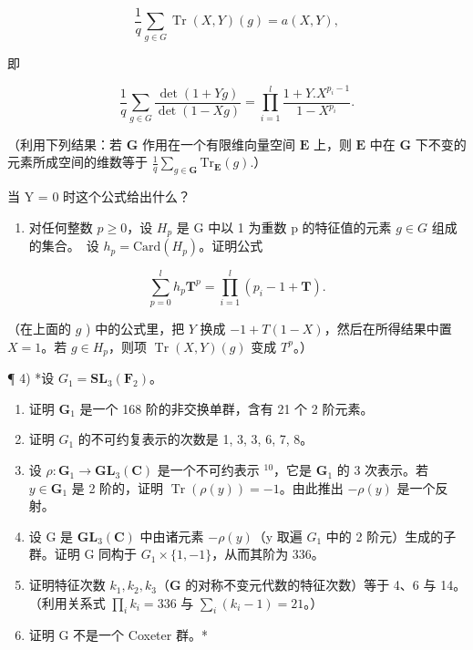\[
\frac {1}{q} \sum_ {g \in G} \operatorname{Tr} (X, Y) (g) = a (X, Y),
\]

即

\[
\frac {1}{q} \sum_ {g \in G} \frac {\det (1 + Y g)}{\det (1 - X g)} = \prod_ {i = 1} ^ {l} \frac {1 + Y . X ^ {p _ {i} - 1}}{1 - X ^ {p _ {i}}}.
\]

（利用下列结果：若 \(\mathbf{G}\) 作用在一个有限维向量空间 \(\mathbf{E}\) 上，则 \(\mathbf{E}\) 中在 \(\mathbf{G}\) 下不变的元素所成空间的维数等于 \(\frac{1}{q}\sum_{g\in \mathbf{G}}\mathrm{Tr}_{\mathbf{E}}(g).\)）

当 Y = 0 时这个公式给出什么？

\begin{enumerate}
\def\labelenumi{\alph{enumi})}
\setcounter{enumi}{7}
\tightlist
\item
  对任何整数 \(p \geqslant 0\)，设 \(H_{p}\) 是 G 中以 1 为重数 p 的特征值的元素 \(g \in G\) 组成的集合。~设 \(h_{p} = \text{Card}(H_{p})\)。证明公式
\end{enumerate}

\[
\sum_ {p = 0} ^ {l} h _ {p} \mathbf {T} ^ {p} = \prod_ {i = 1} ^ {l} (p _ {i} - 1 + \mathbf {T}).
\]

（在上面的 \(g\) ) 中的公式里，把 \(Y\) 换成 \(-1 + T(1 - X)\)，然后在所得结果中置 \(X = 1\)。若 \(g \in H_p\)，则项 \(\operatorname{Tr}(X, Y)(g)\) 变成 \(T^p\)。）

¶ 4) *设 \(G _ {1} = \mathbf {S L} _ {3} (\mathbf {F} _ {2})\)。

\begin{enumerate}
\def\labelenumi{\alph{enumi})}
\item
  证明 \(\mathbf{G}_1\) 是一个 168 阶的非交换单群，含有 21 个 2 阶元素。
\item
  证明 \(G_{1}\) 的不可约复表示的次数是 1, 3, 3, 6, 7, 8。
\item
  设 \(\rho: \mathbf{G}_1 \to \mathbf{GL}_3(\mathbf{C})\) 是一个不可约表示 \(^{10}\)，它是 \(\mathbf{G}_1\) 的 3 次表示。若 \(y \in \mathbf{G}_1\) 是 2 阶的，证明 \(\operatorname{Tr}(\rho(y)) = -1\)。由此推出 \(-\rho(y)\) 是一个反射。
\item
  设 G 是 \(\mathbf{GL}_{3}(\mathbf{C})\) 中由诸元素 \(-\rho(y)\)（y 取遍 \(G_{1}\) 中的 2 阶元）生成的子群。证明 G 同构于 \(G_{1} \times \{1, -1\}\)，从而其阶为 336。
\item
  证明特征次数 \(k_{1}, k_{2}, k_{3}\)（\(\mathbf{G}\) 的对称不变元代数的特征次数）等于 4、6 与 14。（利用关系式 \(\prod_{i} k_{i} = 336\) 与 \(\sum_{i} (k_{i} - 1) = 21\)。）
\item
  证明 G 不是一个 Coxeter 群。*
\end{enumerate}

